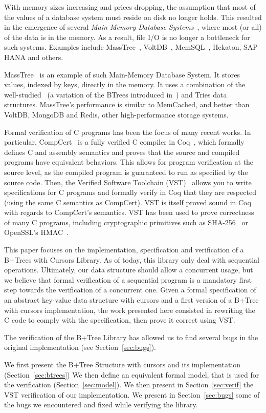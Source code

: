   With memory sizes increasing and prices dropping, the assumption that most of the values of a database system must reside on disk no longer holds.
  This resulted in the emergence of several \textit{Main Memory Database Systems}~\cite{mmdb}, where most (or all) of the data is in the memory.
  As a result, file I/O is no longer a bottleneck for such systems.
  Examples include MassTree~\cite{masstree}, VoltDB~\cite{voltdb}, MemSQL~\cite{memsql}, Hekaton, SAP HANA and others.

  MassTree~\cite{masstree} is an example of such Main-Memory Database System.
  It stores values, indexed by keys, directly in the memory.
  It uses a combination of the well-studied \btrees\ (a variation of the BTrees introduced in~\cite{btrees}) and Tries data structures.
  MassTree's performance is similar to MemCached, and better than VoltDB, MongoDB and Redis, other high-performance storage systems.

  Formal verification of C programs has been the focus of many recent works.
  In particular, CompCert~\cite{compcert,compcert2} is a fully verified C compiler in Coq~\cite{coq}, which formally defines C and assembly semantics and proves that the source and compiled programs have equivalent behaviors.
  This allows for program verification at the source level, as the compiled program is guaranteed to run as specified by the source code.
  Then, the Verified Software Toolchain (VST)~\cite{vst} allows you to write specifications for C programs and formally verify in Coq that they are respected (using the same C semantics as CompCert).
  VST is itself proved sound in Coq with regards to CompCert's semantics.
  VST has been used to prove correctness of many C programs, including cryptographic primitives such as SHA-256~\cite{sha} or OpenSSL's HMAC~\cite{hmac}.

  This paper focuses on the implementation, specification and verification of a B+Trees with Cursors Library.
  As of today, this library only deal with sequential operations.
  Ultimately, our data structure should allow a concurrent usage, but we believe that formal verification of a sequential program is a mandatory first step towards the verification of a concurrent one.
  Given a formal specification of an abstract key-value data structure with cursors and a first version of a B+Tree with cursors implementation, the work presented here consisted in rewriting the C code to comply with the specification, then prove it correct using VST.

  The verification of the B+Tree Library has allowed us to find several bugs in the original implementation (see Section~\ref{sec:bugs}).

  We first present the B+Tree Structure with cursors and its implementation (Section~\ref{sec:btrees})
  We then define an equivalent formal model, that is used for the verification (Section~\ref{sec:model}).
  We then present in Section~\ref{sec:verif} the VST verification of our implementation.
  We present in Section~\ref{sec:bugs} some of the bugs we encountered and fixed while verifying the library.
